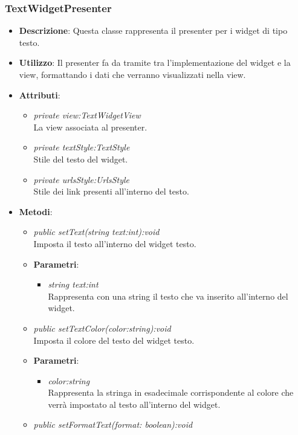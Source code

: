 \subsubsection{TextWidgetPresenter}
\begin{itemize}
\item \textbf{Descrizione}: Questa classe rappresenta il presenter per i widget di tipo testo.
\item \textbf{Utilizzo}: Il presenter fa da tramite tra l'implementazione del widget e la view,  formattando i dati che verranno visualizzati nella view.
\item \textbf{Attributi}:
	\begin{itemize}
	\item \textit{private view:TextWidgetView}\\
	La view associata al presenter.
	\item \textit{private textStyle:TextStyle}\\
	Stile del testo del widget.
	\item \textit{private urlsStyle:UrlsStyle}\\
	Stile dei link presenti all'interno del testo.
	\end{itemize}
\item \textbf{Metodi}:
	\begin{itemize}
	\item \textit{public setText(string text:int):void}\\
	Imposta il testo all'interno del widget testo.
		\item{\textbf{Parametri}: \begin{itemize}
		\item \textit{string text:int}\\
		Rappresenta con una string il testo che va inserito all'interno del widget.
		\end{itemize}}
	\item \textit{public setTextColor(color:string):void}\\
	Imposta il colore del testo del widget testo.
		\item{\textbf{Parametri}: \begin{itemize}
		\item \textit{color:string}\\
		Rappresenta la stringa in esadecimale corrispondente al colore che verrà impostato al testo all'interno del widget.
		\end{itemize}}
	\item \textit{public setFormatText(format: boolean):void}\\

\end{itemize}
\end{itemize}

